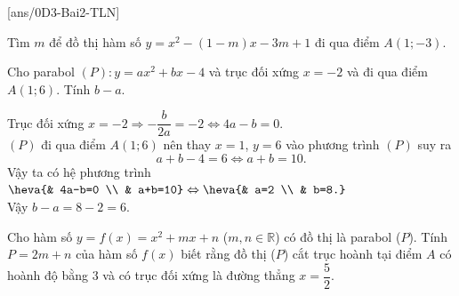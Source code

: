  
\setcounter{ex}{0}
[ans/0D3-Bai2-TLN]%
\begin{ex}%
	Tìm $m$ để đồ thị hàm số $y=x^2-(1-m)x-3m+1$ đi qua điểm $A(1;-3)$.
	\par{}
\end{ex}
\begin{ex}%
	Cho parabol $(P)\colon y=ax^2+b x-4$ và trục đối xứng $x=-2$ và đi qua điểm $A\left(1;6\right)$. Tính $b-a$.
	\par{}
	\loigiai
	{
			Trục đối xứng $x=-2\Rightarrow-\dfrac{b}{2a}=-2\Leftrightarrow 4a-b=0$.\\
			$(P)$ đi qua điểm $A(1;6)$ nên thay $x=1$, $y=6$ vào phương trình $(P)$ suy ra \[a+b-4=6\Leftrightarrow a+b=10.\]
			Vậy ta có hệ phương trình $\heva{& 4a-b=0 \\ & a+b=10}\Leftrightarrow\heva{& a=2 \\ & b=8.}$\\
			Vậy $b-a=8-2=6$.
		}
\end{ex}

\begin{ex}%
	Cho hàm số $y = f(x) = x^2 + mx + n$ ($m, n \in \mathbb{R}$) có đồ thị là parabol ($P$). Tính $ P=2m+n $ của hàm số $f(x)$ biết rằng đồ thị ($P$) cắt trục hoành tại điểm $A$ có hoành độ bằng $3$ và có trục đối xứng là đường thẳng $x = \dfrac{5}{2}$.
	\par{}
\end{ex}



